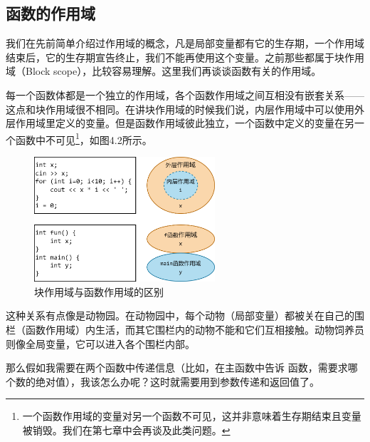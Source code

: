 \subsection*{函数的作用域}
我们在先前简单介绍过作用域的概念，凡是局部变量都有它的生存期，一个作用域结束后，它的生存期宣告终止，我们不能再使用这个变量。之前那些都属于块作用域（Block scope），比较容易理解。这里我们再谈谈函数有关的作用域。\par
每一个函数体都是一个独立的作用域，各个函数作用域之间互相没有嵌套关系——这点和块作用域很不相同。在讲块作用域的时候我们说，内层作用域中可以使用外层作用域里定义的变量。但是函数作用域彼此独立，一个函数中定义的变量在另一个函数中不可见\footnote{一个函数作用域的变量对另一个函数不可见，这并非意味着生存期结束且变量被销毁。我们在第七章中会再谈及此类问题。}，如图4.2所示。\par
\begin{figure}[htbp]
    \centering
    \includegraphics[width=0.6\textwidth]{../images/generalized_parts/04_block_scope_and_function_scope.drawio.png}
    \caption{块作用域与函数作用域的区别}
\end{figure}
这种关系有点像是动物园。在动物园中，每个动物（局部变量）都被关在自己的围栏（函数作用域）内生活，而其它围栏内的动物不能和它们互相接触。动物饲养员则像全局变量，它可以进入各个围栏内部。\par
那么假如我需要在两个函数中传递信息（比如，在主函数中告诉 \lstinline@f@ 函数，需要求哪个数的绝对值），我该怎么办呢？这时就需要用到参数传递和返回值了。\par
